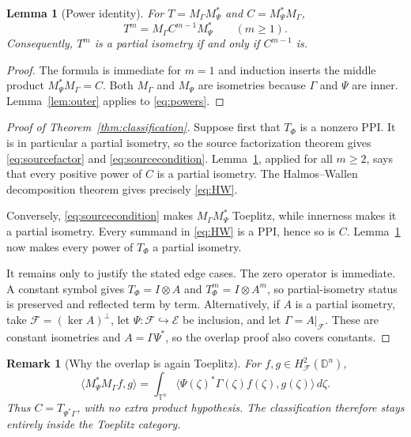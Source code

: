 \documentclass[11pt]{article}
\newtheorem{lemma}[theorem]{Lemma}
\newtheorem{remark}[theorem]{Remark}
\newcommand{\D}{\mathbb D}
\newcommand{\T}{\mathbb T}
\begin{document}
\begin{lemma}[Power identity]\label{lem:powers}
For $T=M_\Gamma M_\Psi^*$ and $C=M_\Psi^*M_\Gamma$,
\begin{equation}\label{eq:powers}
 T^m=M_\Gamma C^{m-1}M_\Psi^*\qquad(m\geq1).
\end{equation}
Consequently, $T^m$ is a partial isometry if and only if $C^{m-1}$ is.
\end{lemma}

\begin{proof}
The formula is immediate for $m=1$ and induction inserts the middle product
$M_\Psi^*M_\Gamma=C$.  Both $M_\Gamma$ and $M_\Psi$ are isometries because
$\Gamma$ and $\Psi$ are inner.  Lemma~\ref{lem:outer} applies to
\eqref{eq:powers}.
\end{proof}

\begin{proof}[Proof of Theorem~\ref{thm:classification}]
Suppose first that $T_\Phi$ is a nonzero PPI.  It is in particular a partial
isometry, so the source factorization theorem gives \eqref{eq:sourcefactor}
and \eqref{eq:sourcecondition}.  Lemma~\ref{lem:powers}, applied for all
$m\geq2$, says that every positive power of $C$ is a partial isometry.  The
Halmos--Wallen decomposition theorem \cite{HalmosWallen} gives precisely
\eqref{eq:HW}.

Conversely, \eqref{eq:sourcecondition} makes $M_\Gamma M_\Psi^*$ Toeplitz,
while innerness makes it a partial isometry.  Every summand in \eqref{eq:HW}
is a PPI, hence so is $C$.  Lemma~\ref{lem:powers} now makes every power of
$T_\Phi$ a partial isometry.

It remains only to justify the stated edge cases.  The zero operator is
immediate.  A constant symbol gives $T_\Phi=I\otimes A$ and
$T_\Phi^m=I\otimes A^m$, so partial-isometry status is preserved and
reflected term by term.  Alternatively, if $A$ is a partial isometry, take
$\mathcal F=(\ker A)^\perp$, let $\Psi:\mathcal F\hookrightarrow\mathcal E$
be inclusion, and let $\Gamma=A|_{\mathcal F}$.  These are constant
isometries and $A=\Gamma\Psi^*$, so the overlap proof also covers constants.
\end{proof}

\begin{remark}[Why the overlap is again Toeplitz]
For $f,g\in H^2_{\mathcal F}(\D^n)$,
\[
 \langle M_\Psi^*M_\Gamma f,g\rangle
 =\int_{\T^n}\langle\Psi(\zeta)^*\Gamma(\zeta)f(\zeta),g(\zeta)\rangle
 \,d\zeta.
\]
Thus $C=T_{\Psi^*\Gamma}$, with no extra product hypothesis.  The
classification therefore stays entirely inside the Toeplitz category.
\end{remark}
\end{document}
